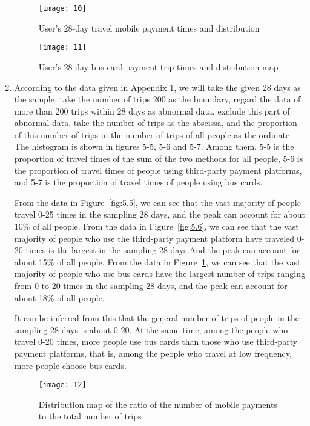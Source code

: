 \documentclass[../mcmpaper]{subfiles}
\begin{document}
\begin{enumerate}[label=\arabic*., format=\bfseries, itemindent=0pt, leftmargin=0pt, topsep=0pt, listparindent=\parindent, itemsep=1pt]
\begin{figure}[!ht]
\begin{minipage}[c]{0.48\linewidth}
    \label{fig:5.5}
\end{minipage}
\begin{minipage}[c]{0.48\linewidth}
    \centering
    \texttt{[image: 10]}
    \caption{User's 28-day travel mobile payment times and distribution}
    \label{fig:5.6}
    \end{minipage}
\begin{minipage}[c]{1\linewidth}
    \centering
    \texttt{[image: 11]}
    \caption{User's 28-day bus card payment trip times and distribution map}
    \label{fig:5.7}
\end{minipage}
\end{figure}
    \item According to the data given in Appendix 1, we will take the given 28 days as the sample, take the number of trips 200 as the boundary, regard the data of more than 200 trips within 28 days as abnormal data, exclude this part of abnormal data, take the number of trips as the abscissa, and the proportion of this number of trips in the number of trips of all people as the ordinate. The histogram is shown in figures 5-5, 5-6 and 5-7. Among them, 5-5 is the proportion of travel times of the sum of the two methods for all people, 5-6 is the proportion of travel times of people using third-party payment platforms, and 5-7 is the proportion of travel times of people using bus cards.
\par
From the data in Figure~\ref{fig:5.5}, we can see that the vast majority of people travel 0-25 times in the sampling 28 days, and the peak can account for about 10\% of all people. From the data in Figure~\ref{fig:5.6}, we can see that the vast majority of people who use the third-party payment platform have traveled 0-20 times is the largest in the sampling 28 days.And the peak can account for about 15\% of all people. From the data in Figure~\ref{fig:5.7}, we can see that the vast majority of people who use bus cards have the largest number of trips ranging from 0 to 20 times in the sampling 28 days, and the peak can account for about 18\% of all people.
\par
It can be inferred from this that the general number of trips of people in the sampling 28 days is about 0-20. At the same time, among the people who travel 0-20 times, more people use bus cards than those who use third-party payment platforms, that is, among the people who travel at low frequency, more people choose bus cards.
\begin{figure}[!ht]
    \centering
    \texttt{[image: 12]}
    \caption{Distribution map of the ratio of the number of mobile payments to the total number of trips}

\end{figure}
\end{enumerate}
\end{document}
